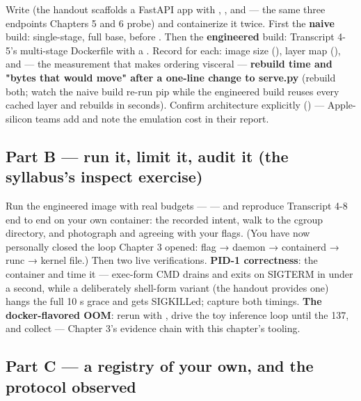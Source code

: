 Write  (the handout scaffolds a FastAPI app with , , and  — the same three endpoints Chapters 5 and 6 probe) and containerize it twice. First the \textbf{naive} build: single-stage, full base,  before . Then the \textbf{engineered} build: Transcript 4-5's multi-stage Dockerfile with a . Record for each: image size (), layer map (), and — the measurement that makes ordering visceral — \textbf{rebuild time and "bytes that would move" after a one-line change to serve.py} (rebuild both; watch the naive build re-run pip while the engineered build reuses every cached layer and rebuilds in seconds). Confirm architecture explicitly () — Apple-silicon teams add  and note the emulation cost in their report.

\subsection*{Part B — run it, limit it, audit it (the syllabus's inspect exercise)}

Run the engineered image with real budgets —  — and reproduce Transcript 4-8 end to end on your own container:  the recorded intent, walk  to the cgroup directory, and photograph  and  agreeing with your flags. (You have now personally closed the loop Chapter 3 opened: flag → daemon → containerd → runc → kernel file.) Then two live verifications. \textbf{PID-1 correctness}:  the container and time it — exec-form CMD drains and exits on SIGTERM in under a second, while a deliberately shell-form variant (the handout provides one) hangs the full 10 s grace and gets SIGKILLed; capture both timings. \textbf{The docker-flavored OOM}: rerun with , drive the toy inference loop until the 137, and collect  — Chapter 3's evidence chain with this chapter's tooling.

\subsection*{Part C — a registry of your own, and the protocol observed}

